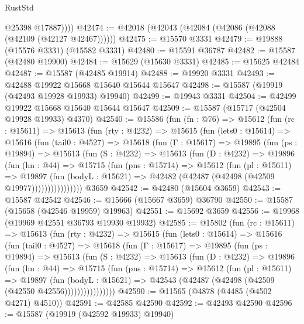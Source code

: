 \begin{lexlean}{RustStd}
\begin{coremodule}
            @25398
            @17887))))
@42474 := @42018 (@42043 (@42084 (@42086 (@42088 (@42109 (@42127 @42467))))))
@42475 := @15570 @3331
@42479 := @19888 (@15576 @3331) (@15582 @3331)
@42480 := @15591 @36787
@42482 := @15587 (@42480 @19900)
@42484 := @15629 (@15630 @3331)
@42485 := @15625 @42484
@42487 := @15587 (@42485 @19914)
@42488 := @19920 @3331
@42493 := @42488 @19922 @15668 @15640 @15644 @15647
@42498 := @15587 (@19919 (@42493 @19928 @19933) @19940)
@42499 := @19943 @3331
@42504 := @42499 @19922 @15668 @15640 @15644 @15647
@42509 := @15587 (@15717 (@42504 @19928 @19933) @4370)
@42540 := @15586
    (fun (fn : @76) =>
    @15612
      (fun (rc : @15611) =>
      @15613
        (fun (rty : @4232) =>
        @15615
          (fun (lets0 : @15614) =>
          @15616
            (fun (tail0 : @4527) =>
            @15618
              (fun (Γ : @15617) =>
              @19895
                (fun (ps : @19894) =>
                @15613
                  (fun (S : @4232) =>
                  @15613
                    (fun (D : @4232) =>
                    @19896
                      (fun (hn : @44) =>
                      @15715
                        (fun (pns : @15714) =>
                        @15612
                          (fun (pl : @15611) =>
                          @19897
                            (fun (bodyL : @15621) =>
                            @42482 (@42487 (@42498 (@42509 @19977))))))))))))))))
    @3659
@42542 := @42480 (@15604 @3659)
@42543 := @15587 @42542
@42546 := @15666 (@15667 @3659) @36790
@42550 := @15587 (@15658 (@42546 @19959) @19963)
@42551 := @15692 @3659
@42556 := @19968 (@19969 @42551 @36793 @19930 @19932)
@42585 := @15802
    (fun (rc : @15611) =>
    @15613
      (fun (rty : @4232) =>
      @15615
        (fun (lets0 : @15614) =>
        @15616
          (fun (tail0 : @4527) =>
          @15618
            (fun (Γ : @15617) =>
            @19895
              (fun (ps : @19894) =>
              @15613
                (fun (S : @4232) =>
                @15613
                  (fun (D : @4232) =>
                  @19896
                    (fun (hn : @44) =>
                    @15715
                      (fun (pns : @15714) =>
                      @15612
                        (fun (pl : @15611) =>
                        @19897
                          (fun (bodyL : @15621) =>
                          @42543 (@42487 (@42498 (@42509 (@42550 @42556))))))))))))))))
@42590 := @11565 (@4878 (@4485 (@4502 @4271) @4510))
@42591 := @42585 @42590
@42592 := @42493 @42590
@42596 := @15587 (@19919 (@42592 @19933) @19940)

\end{coremodule}
\end{lexlean}
